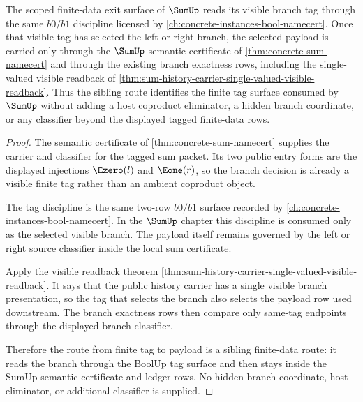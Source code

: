 \begin{theorem}
\label{thm:sum-finite-data-sibling-route}
The scoped finite-data exit surface of $\SumUp$ reads its visible branch tag through the same $b0/b1$ discipline licensed by \autoref{ch:concrete-instances-bool-namecert}. Once that visible tag has selected the left or right branch, the selected payload is carried only through the $\SumUp$ semantic certificate of \autoref{thm:concrete-sum-namecert} and through the existing branch exactness rows, including the single-valued visible readback of \autoref{thm:sum-history-carrier-single-valued-visible-readback}. Thus the sibling route identifies the finite tag surface consumed by $\SumUp$ without adding a host coproduct eliminator, a hidden branch coordinate, or any classifier beyond the displayed tagged finite-data rows.
\end{theorem}
\begin{proof}
The semantic certificate of \autoref{thm:concrete-sum-namecert} supplies the carrier and classifier for the tagged sum packet. Its two public entry forms are the displayed injections $\Ezero(l)$ and $\Eone(r)$, so the branch decision is already a visible finite tag rather than an ambient coproduct object.

The tag discipline is the same two-row $b0/b1$ surface recorded by \autoref{ch:concrete-instances-bool-namecert}. In the $\SumUp$ chapter this discipline is consumed only as the selected visible branch. The payload itself remains governed by the left or right source classifier inside the local sum certificate.

Apply the visible readback theorem \autoref{thm:sum-history-carrier-single-valued-visible-readback}. It says that the public history carrier has a single visible branch presentation, so the tag that selects the branch also selects the payload row used downstream. The branch exactness rows then compare only same-tag endpoints through the displayed branch classifier.

Therefore the route from finite tag to payload is a sibling finite-data route: it reads the branch through the BoolUp tag surface and then stays inside the SumUp semantic certificate and ledger rows. No hidden branch coordinate, host eliminator, or additional classifier is supplied.
\end{proof}

